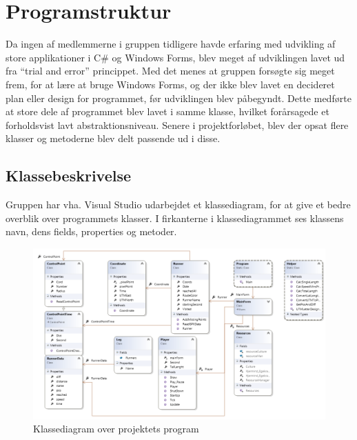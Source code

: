 \section{Programstruktur}
Da ingen af medlemmerne i gruppen tidligere havde erfaring med udvikling af store applikationer i C\# og Windows Forms, blev meget af udviklingen lavet ud fra “trial and error” princippet. Med det menes at gruppen forsøgte sig meget frem, for at lære at bruge Windows Forms, og der ikke blev lavet en decideret plan eller design for programmet, før udviklingen blev påbegyndt. Dette medførte at store dele af programmet blev lavet i samme klasse, hvilket forårsagede et forholdsvist lavt abstraktionsniveau. Senere i projektforløbet, blev der opsat flere klasser og metoderne blev delt passende ud i disse.

\subsection{Klassebeskrivelse}
Gruppen har vha. Visual Studio udarbejdet et klassediagram, for at give et bedre overblik over programmets klasser. I firkanterne i klassediagrammet ses klassens navn, dens fields, properties og metoder.

\begin{figure} [h]
	\centering
	\includegraphics[width=1\textwidth]{billeder/KlasseDiagram}
	\caption{Klassediagram over projektets program}
\end{figure}

